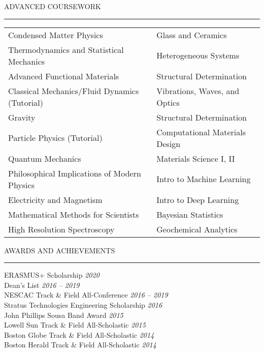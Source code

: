 \documentclass{resume} %
\renewenvironment{rSection}[1]{
	\sectionskip
	\textcolor{RoyalPurple}{\MakeUppercase{#1}}
	\sectionlineskip
	\hrule
	\begin{list}{}{
			\setlength{\leftmargin}{1.5em}
		}
		\item[]
	}{
	\end{list}
}
\begin{document}
	\begin{rSection}{Advanced Coursework} \itemsep -2pt
			\begin{tabular}{ @{} >{}l @{\hspace{6ex}} l }
				Condensed Matter Physics & Glass and Ceramics  \\
				Thermodynamics and Statistical Mechanics & Heterogeneous Systems \\
				Advanced Functional Materials & Structural Determination \\
				Classical Mechanics/Fluid Dynamics (Tutorial) & Vibrations, Waves, and Optics \\
				Gravity & Structural Determination\\
				Particle Physics (Tutorial) & Computational Materials Design\\
				Quantum Mechanics & Materials Science I, II\\
				Philosophical Implications of Modern Physics & Intro to Machine Learning\\
				Electricity and Magnetism & Intro to Deep Learning \\
				Mathematical Methods for Scientists & Bayesian Statistics \\
				High Resolution Spectroscopy & Geochemical Analytics
			\end{tabular}
	\end{rSection}

	\begin{rSection}{Awards and Achievements} \itemsep -2pt
		ERASMUS+ Scholarship \hfill \textit{2020}\\
		Dean's List \hfill \textit{2016 -- 2019}\\
		NESCAC Track \& Field All-Conference \hfill \textit{2016 -- 2019}\\
		Stratus Technologies Engineering Scholarship \hfill \textit{2016} \\
		John Phillips Sousa Band Award \hfill \textit{2015}\\
		Lowell Sun Track \& Field All-Scholastic \hfill \textit{2015} \\
		Boston Globe Track \& Field All-Scholastic \hfill \textit{2014}\\
		Boston Herald Track \& Field All-Scholastic \hfill \textit{2014} \\
	\end{rSection}
\end{document}
